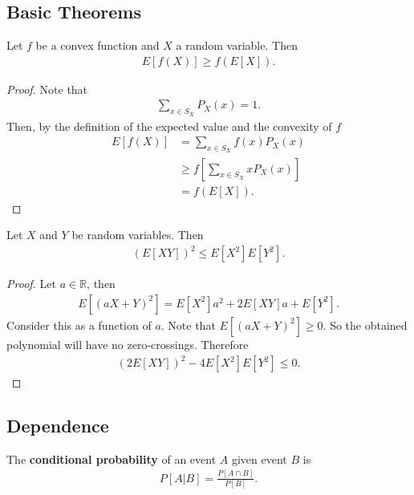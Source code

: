 \documentclass{memoir}
\begin{document}
\subsection{Basic Theorems}

\begin{theorem}
    Let $f$ be a convex function and $X$ a random variable. Then
    \begin{align*}
        E[f(X)] \ge f(E[X]).
    \end{align*}
\end{theorem}
\begin{proof}
    Note that
    \begin{align*}
        \sum_{x \in S_X} P_X(x) = 1.
    \end{align*}
    Then, by the definition of the expected value and the convexity of $f$
    \begin{align*}
        E[f(X)] &= \sum_{x \in S_X} f(x) P_X(x) \\
        &\ge f\left[\sum_{x \in S_X} x P_X(x) \right] \\
        &=f(E[X]).
    \end{align*}
\end{proof}

\begin{theorem}
    Let $X$ and $Y$ be random variables. Then
    \begin{align*}
        (E[XY])^2 \le E[X^2]E[Y^2].
    \end{align*}
\end{theorem}
\begin{proof}
    Let $a \in \mathbb{R}$, then
    \begin{align*}
        E[(a X + Y)^2] = E[X^2]a^2  + 2E[XY]a + E[Y^2].
    \end{align*}
    Consider this as a function of $a$. Note that  $E[(aX+Y)^2]\ge0$. So the obtained polynomial will have no zero-crossings. Therefore
    \begin{align*}
        (2 E[XY])^2-4 E[X^2] E[Y^2] \le 0.
    \end{align*}
\end{proof}

\subsection{Dependence}

\begin{definition}
    The \textbf{conditional probability} of an event $A$ given event $B$ is
    \begin{align*}
        P[A|B] = \frac{P[A \cap B]}{P[B]}.
    \end{align*}
\end{definition}
\end{document}
